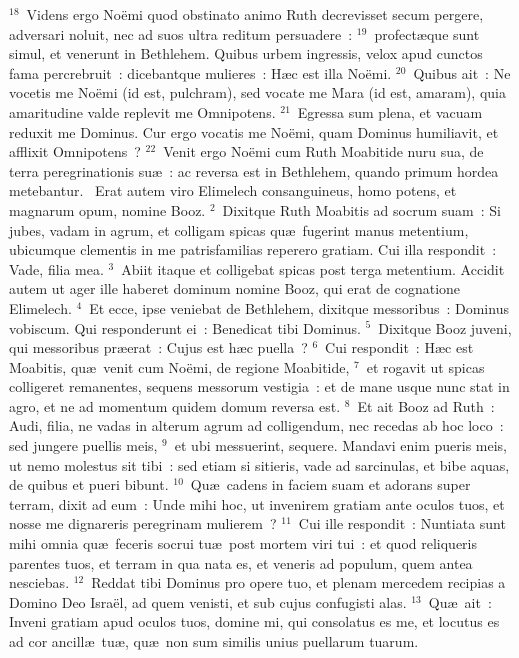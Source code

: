 ${}^{18}$~Videns ergo No\"emi quod obstinato animo Ruth decrevisset secum pergere, adversari noluit, nec ad suos ultra reditum persuadere~:
${}^{19}$~profect\ae que sunt simul, et venerunt in Bethlehem. Quibus urbem ingressis, velox apud cunctos fama percrebruit~: dicebantque mulieres~: H\ae c est illa No\"emi.
${}^{20}$~Quibus ait~: Ne vocetis me No\"emi (id est, pulchram), sed vocate me Mara (id est, amaram), quia amaritudine valde replevit me Omnipotens.
${}^{21}$~Egressa sum plena, et vacuam reduxit me Dominus. Cur ergo vocatis me No\"emi, quam Dominus humiliavit, et afflixit Omnipotens~?
${}^{22}$~Venit ergo No\"emi cum Ruth Moabitide nuru sua, de terra peregrinationis su\ae~: ac reversa est in Bethlehem, quando primum hordea metebantur.
~Erat autem viro Elimelech consanguineus, homo potens, et magnarum opum, nomine Booz.
${}^{2}$~Dixitque Ruth Moabitis ad socrum suam~: Si jubes, vadam in agrum, et colligam spicas qu\ae\ fugerint manus metentium, ubicumque clementis in me patrisfamilias reperero gratiam. Cui illa respondit~: Vade, filia mea.
${}^{3}$~Abiit itaque et colligebat spicas post terga metentium. Accidit autem ut ager ille haberet dominum nomine Booz, qui erat de cognatione Elimelech.
${}^{4}$~Et ecce, ipse veniebat de Bethlehem, dixitque messoribus~: Dominus vobiscum. Qui responderunt ei~: Benedicat tibi Dominus.
${}^{5}$~Dixitque Booz juveni, qui messoribus pr\ae erat~: Cujus est h\ae c puella~?
${}^{6}$~Cui respondit~: H\ae c est Moabitis, qu\ae\ venit cum No\"emi, de regione Moabitide,
${}^{7}$~et rogavit ut spicas colligeret remanentes, sequens messorum vestigia~: et de mane usque nunc stat in agro, et ne ad momentum quidem domum reversa est.
${}^{8}$~Et ait Booz ad Ruth~: Audi, filia, ne vadas in alterum agrum ad colligendum, nec recedas ab hoc loco~: sed jungere puellis meis,
${}^{9}$~et ubi messuerint, sequere. Mandavi enim pueris meis, ut nemo molestus sit tibi~: sed etiam si sitieris, vade ad sarcinulas, et bibe aquas, de quibus et pueri bibunt.
${}^{10}$~Qu\ae\ cadens in faciem suam et adorans super terram, dixit ad eum~: Unde mihi hoc, ut invenirem gratiam ante oculos tuos, et nosse me dignareris peregrinam mulierem~?
${}^{11}$~Cui ille respondit~: Nuntiata sunt mihi omnia qu\ae\ feceris socrui tu\ae\ post mortem viri tui~: et quod reliqueris parentes tuos, et terram in qua nata es, et veneris ad populum, quem antea nesciebas.
${}^{12}$~Reddat tibi Dominus pro opere tuo, et plenam mercedem recipias a Domino Deo Isra\"el, ad quem venisti, et sub cujus confugisti alas.
${}^{13}$~Qu\ae\ ait~: Inveni gratiam apud oculos tuos, domine mi, qui consolatus es me, et locutus es ad cor ancill\ae\ tu\ae , qu\ae\ non sum similis unius puellarum tuarum.
